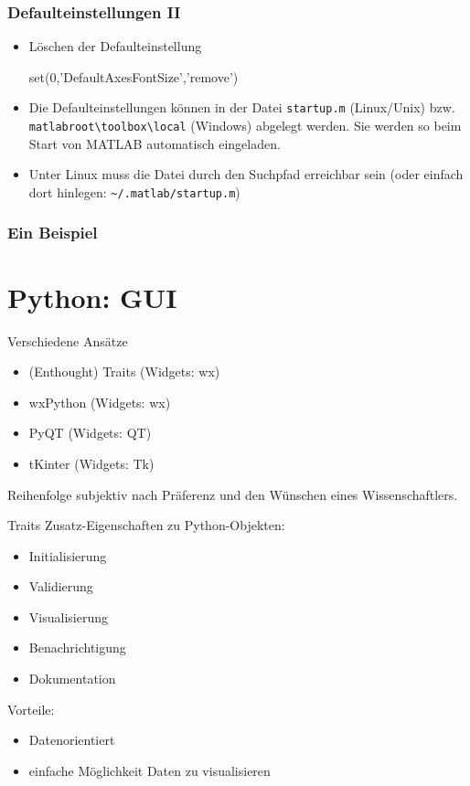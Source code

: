\documentclass[hyperref={xetex}]{beamer}
\begin{document}
%
%
\begin{frame}[fragile]\frametitle{Defaulteinstellungen II}
\begin{itemize}
\item L\"oschen der Defaulteinstellung
\begin{matlabin}
set(0,'DefaultAxesFontSize','remove')
\end{matlabin}
\item Die Defaulteinstellungen k\"onnen in der Datei \verb!startup.m!  (Linux/Unix)
   bzw. \verb!matlabroot\toolbox\local! (Windows) abgelegt werden. Sie werden so
  beim Start von MATLAB automatisch eingeladen. 
\item Unter Linux muss die Datei durch den Suchpfad  erreichbar
  sein (oder einfach dort hinlegen: \verb!~/.matlab/startup.m!)
\end{itemize} 
\end{frame}
\begin{frame}[fragile]\frametitle{Ein Beispiel}
\end{frame}



\section{Python: GUI}

\begin{frame}[fragile]{Verschiedene Ansätze}
\begin{itemize}
  \item \alert{(Enthought) Traits (Widgets: wx)}
  \item wxPython (Widgets: wx)
  \item PyQT (Widgets: QT)
  \item tKinter (Widgets: Tk)
\end{itemize}
Reihenfolge subjektiv nach Präferenz und den Wünschen eines Wissenschaftlers.

\end{frame}

\begin{frame}[fragile]{Traits}
Zusatz-Eigenschaften zu Python-Objekten:
\begin{itemize}
  \item Initialisierung
  \item Validierung
  \item \alert{Visualisierung}
  \item Benachrichtigung
  \item Dokumentation
\end{itemize}

Vorteile:
\begin{itemize}
  \item Datenorientiert
  \item einfache Möglichkeit Daten zu visualisieren
\end{itemize}
\end{frame}
\end{document}
